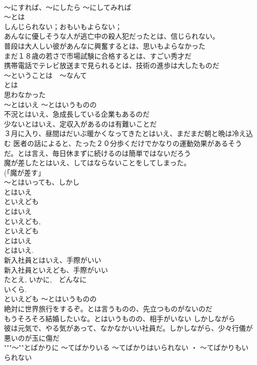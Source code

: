 \documentclass[8pt]{extreport}
\begin{document}
\begin{CJK}{UTF8}{min}
\\	～にすれば、～にしたら ～にしてみれば
\\	～とは	
\\	しんじられない；おもいもよらない；
\\	あんなに優しそうな人が逃亡中の殺人犯だったとは、信じられない。 
\\	普段は大人しい彼があんなに興奮するとは、思いもよらなかった
\\	まだ１８歳の若さで市場試験に合格するとは、すごい秀才だ 
\\	携帯電話でテレビ放送まで見られるとは、技術の進歩は大したものだ 
\\	～ということは　～なんて 
\\	とは 
\\	思わなかった 
\\	～とはいえ ～とはいうものの	
\\	不況とはいえ、急成長している企業もあるのだ 
\\	少ないとはいえ、定収入があるのは有難いことだ 
\\	３月に入り、昼間はだいぶ暖かくなってきたとはいえ、まだまだ朝と晩は冷え込む 医者の話によると、たった２０分歩くだけでかなりの運動効果があるそうだ。とは言え、毎日休まずに続けるのは簡単ではないだろう 
\\	魔が差したとはいえ、してはならないことをしてしまった。
\\	(「魔が差す」
\\	～とはいっても、しかし 
\\	とはいえ 
\\	といえども 
\\	とはいえ 
\\	といえども, 
\\	といえども 
\\	とはいえ 
\\	とはいえ. 
\\	新入社員とはいえ、手際がいい 
\\	新入社員といえども、手際がいい 
\\	たとえ, いかに,　どんなに 
\\	いくら. 
\\	といえども	～とはいうものの 
\\	絶対に世界旅行をするぞ。とは言うものの、先立つものがないのだ
\\	もうそろそろ結婚したいな。とはいうものの、相手がいない しかしながら 
\\	彼は元気で、やる気があって、なかなかいい社員だ。しかしながら、少々行儀が悪いのが玉に傷だ
\\	"""～""とばかりに ～てばかりいる ～てばかりはいられない ・ ～てばかりもいられない

\end{CJK}
\end{document}
